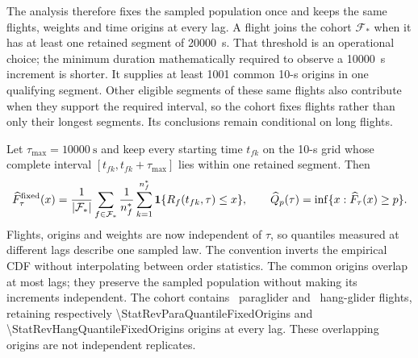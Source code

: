The analysis therefore fixes the sampled population once and keeps the same flights,
weights and time origins at every lag. A flight joins the cohort $\mathcal F_*$ when
it has at least one retained segment of \SI{20000}{\second}. That threshold is an
operational choice; the minimum duration mathematically required to observe a
\SI{10000}{\second} increment is shorter. It supplies at least \num{1001} common
10-s origins in one qualifying segment. Other eligible segments of these same flights
also contribute when they support the required interval, so the cohort fixes flights
rather than only their longest segments. Its conclusions remain conditional on long
flights.

Let $\tau_{\max}=\SI{10000}{\second}$ and keep every starting
time $t_{fk}$ on the 10-s grid whose complete interval
$[t_{fk},t_{fk}+\tau_{\max}]$ lies within one retained segment. Then
\begin{equation}
 \widehat F_\tau^{\rm fixed}(x)
 =\frac1{|\mathcal F_*|}\sum_{f\in\mathcal F_*}\frac1{n_f^*}
     \sum_{k=1}^{n_f^*}\mathbf1\{R_f(t_{fk},\tau)\le x\},\qquad
 \widehat Q_p(\tau)=\inf\{x:\widehat F_\tau(x)\ge p\}.
 \label{eq:quantile-fixed-population}
\end{equation}
Flights, origins and weights are now independent of $\tau$, so quantiles measured at
different lags describe one sampled law. The convention inverts the empirical CDF
without interpolating between order statistics. The common origins overlap at most
lags; they preserve the sampled population without making its increments independent.
The cohort contains \StatRevParaQuantileFixedFlights\ paraglider and
\StatRevHangQuantileFixedFlights\ hang-glider flights, retaining respectively
\num{\StatRevParaQuantileFixedOrigins} and \num{\StatRevHangQuantileFixedOrigins}
origins at every lag. These overlapping origins are not independent replicates.

